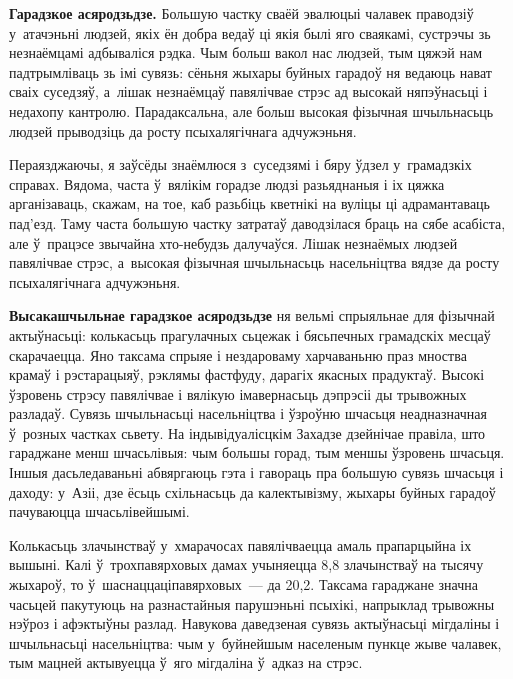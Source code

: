 \textbf{Гарадзкое асяродзьдзе.} Большую частку сваёй эвалюцыі чалавек праводзіў у~атачэньні людзей, якіх ён добра ведаў ці якія былі яго сваякамі, сустрэчы зь незнаёмцамі адбываліся рэдка. Чым больш вакол нас людзей, тым цяжэй нам падтрымліваць зь імі сувязь: сёньня жыхары буйных гарадоў ня ведаюць нават сваіх суседзяў, а~лішак незнаёмцаў павялічвае стрэс ад высокай няпэўнасьці і недахопу кантролю. Парадаксальна, але больш высокая фізычная шчыльнасьць людзей прыводзіць да росту псыхалягічнага адчужэньня.

Пераязджаючы, я заўсёды знаёмлюся з~суседзямі і бяру ўдзел у~грамадзкіх справах. Вядома, часта ў~вялікім горадзе людзі разьяднаныя і іх цяжка арганізаваць, скажам, на тое, каб разьбіць кветнікі на вуліцы ці адрамантаваць пад'езд. Таму часта большую частку затратаў даводзілася браць на сябе асабіста, але ў~працэсе звычайна хто-небудзь далучаўся. Лішак незнаёмых людзей павялічвае стрэс, а~высокая фізычная шчыльнасьць насельніцтва вядзе да росту псыхалягічнага адчужэньня.

\textbf{Высакашчыльнае гарадзкое асяродзьдзе} ня вельмі спрыяльнае для фізычнай актыўнасьці: колькасьць прагулачных сьцежак і бясьпечных грамадскіх месцаў скарачаецца. Яно таксама спрыяе і нездароваму харчаваньню праз мноства крамаў і рэстарацыяў, рэклямы фастфуду, дарагіх якасных прадуктаў. Высокі ўзровень стрэсу павялічвае і вялікую імавернасьць дэпрэсіі ды трывожных разладаў. Сувязь шчыльнасьці насельніцтва і ўзроўню шчасьця неадназначная ў~розных частках сьвету. На індывідуалісцкім Захадзе дзейнічае правіла, што гараджане менш шчасьлівыя: чым большы горад, тым меншы ўзровень шчасьця. Іншыя дасьледаваньні абвяргаюць гэта і гавораць пра большую сувязь шчасьця і даходу: у~Азіі, дзе ёсьць схільнасьць да калектывізму, жыхары буйных гарадоў пачуваюцца шчасьлівейшымі.

Колькасьць злачынстваў у~хмарачосах павялічваецца амаль прапарцыйна іх вышыні. Калі ў~трохпавярховых дамах учыняецца 8,8 злачынстваў на тысячу жыхароў, то ў~шаснаццаціпавярховых~--- да 20,2. Таксама гараджане значна часьцей пакутуюць на разнастайныя парушэньні псыхікі, напрыклад трывожны нэўроз і афэктыўны разлад. Навукова даведзеная сувязь актыўнасьці мігдаліны і шчыльнасьці насельніцтва: чым у~буйнейшым населеным пункце жыве чалавек, тым мацней актывуецца ў~яго мігдаліна ў~адказ на стрэс.


